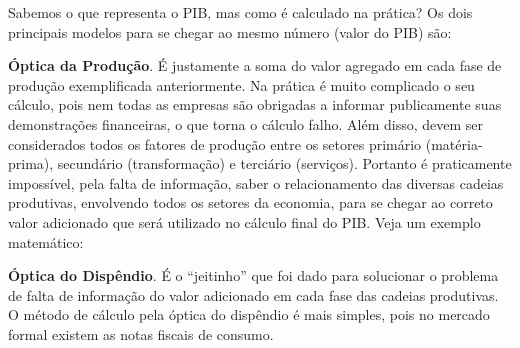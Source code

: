 \documentclass{article}\usepackage[]{graphicx}\usepackage[]{xcolor}
\begin{document}
Sabemos o que representa o PIB, mas como é calculado na prática? Os dois principais modelos para se chegar ao mesmo 
número (valor do PIB) são:\par

\textbf{Óptica da Produção}. É justamente a soma do valor agregado em cada fase de produção exemplificada anteriormente. 
Na prática é muito complicado o seu cálculo, pois nem todas as empresas são obrigadas a informar publicamente suas 
demonstrações financeiras, o que torna o cálculo falho. Além disso, devem ser considerados todos os fatores de produção 
entre os setores primário (matéria-prima), secundário (transformação) e terciário (serviços). 
Portanto é praticamente impossível, pela falta de informação, saber o relacionamento das diversas cadeias produtivas, 
envolvendo todos os setores da economia, para se chegar ao correto valor adicionado que será utilizado no cálculo final 
do PIB. Veja um exemplo matemático:\par 


\begin{table}[H]
\centering
{}
\end{table}

\textbf{Óptica do Dispêndio}. É o \enquote{jeitinho} que foi dado para solucionar o problema de 
falta de informação do valor adicionado em cada fase das cadeias produtivas. O método de cálculo 
pela óptica do dispêndio é mais simples, pois no mercado formal existem as notas fiscais de consumo.\par
\end{document}
